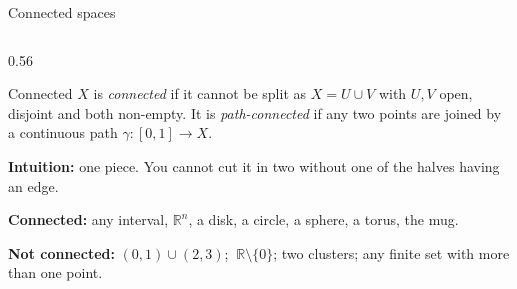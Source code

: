 \documentclass[10pt,aspectratio=169]{beamer}
\newcommand{\R}{\mathbb{R}}
\begin{document}
    \begin{frame}[shrink=3]{Connected spaces}
        \begin{columns}[T,onlytextwidth]
            \begin{column}{0.56\textwidth}
                \small
                \begin{block}{Connected}
                    $X$ is \emph{connected} if it cannot be split as $X=U\cup V$ with $U,V$
                    open, disjoint and both non-empty.
                    It is \emph{path-connected} if any two points are joined by a
                    continuous path $\gamma:[0,1]\to X$.
                \end{block}
                \textbf{Intuition:} one piece. You cannot cut it in two without one of the
                halves having an edge.

                \vspace{0.3em}
                \textbf{Connected:} any interval, $\R^n$, a disk, a circle, a sphere, a
                torus, the mug.

                \vspace{0.2em}
                \textbf{Not connected:} $(0,1)\cup(2,3)$; $\ \R\setminus\{0\}$; two
                clusters; any finite set with more than one point.


\end{column}
\end{columns}
\end{frame}
\end{document}
